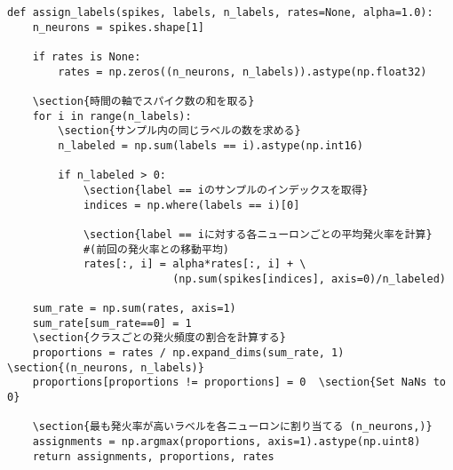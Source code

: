 \begin{verbatim}
def assign_labels(spikes, labels, n_labels, rates=None, alpha=1.0):
    n_neurons = spikes.shape[1] 
    
    if rates is None:        
        rates = np.zeros((n_neurons, n_labels)).astype(np.float32)
    
    \section{時間の軸でスパイク数の和を取る}
    for i in range(n_labels):
        \section{サンプル内の同じラベルの数を求める}
        n_labeled = np.sum(labels == i).astype(np.int16)
    
        if n_labeled > 0:
            \section{label == iのサンプルのインデックスを取得}
            indices = np.where(labels == i)[0]
            
            \section{label == iに対する各ニューロンごとの平均発火率を計算}
            #(前回の発火率との移動平均)
            rates[:, i] = alpha*rates[:, i] + \ 
                          (np.sum(spikes[indices], axis=0)/n_labeled)
    
    sum_rate = np.sum(rates, axis=1)
    sum_rate[sum_rate==0] = 1
    \section{クラスごとの発火頻度の割合を計算する}
    proportions = rates / np.expand_dims(sum_rate, 1) \section{(n_neurons, n_labels)}
    proportions[proportions != proportions] = 0  \section{Set NaNs to 0}
    
    \section{最も発火率が高いラベルを各ニューロンに割り当てる (n_neurons,)}
    assignments = np.argmax(proportions, axis=1).astype(np.uint8) 
    return assignments, proportions, rates
\end{verbatim}
